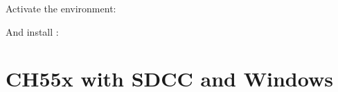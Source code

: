 \documentclass[letterpaper,10pt,english]{sphinxmanual}
\begin{document}
\sphinxAtStartPar
Activate the environment:

\begin{sphinxVerbatim}[commandchars=\\\{\}]
 
\end{sphinxVerbatim}

\sphinxAtStartPar
And install :

\begin{sphinxVerbatim}[commandchars=\\\{\}]
  
\end{sphinxVerbatim}

\sphinxstepscope


\chapter{CH55x with SDCC and Windows}
\label{\detokenize{install_windows:ch55x-with-sdcc-and-windows}}\label{\detokenize{install_windows::doc}}
\end{document}
